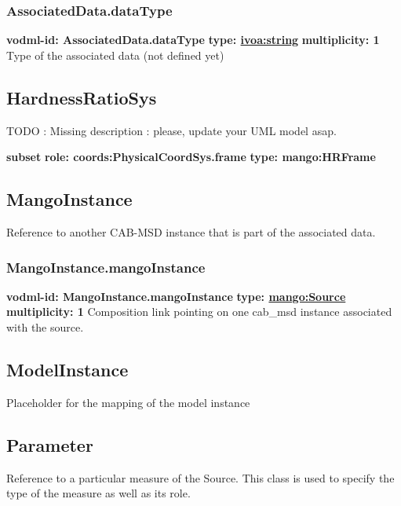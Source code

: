     \subsubsection{AssociatedData.dataType}
      \textbf{vodml-id: AssociatedData.dataType} \newline
      \textbf{type: \hyperref[sect:ivoa]{ivoa:string}} \newline
      \textbf{multiplicity: 1} \newline 
      Type of the associated data (not defined yet)

  \subsection{HardnessRatioSys}
  \label{sect:HardnessRatioSys}
    TODO : Missing description : please, update your UML model asap.

    \noindent \textbf{subset} \newline
    \indent   \textbf{role: coords:PhysicalCoordSys.frame} \newline
    \indent   \textbf{type: mango:HRFrame} \newline


  \subsection{MangoInstance}
  \label{sect:MangoInstance}
    Reference to another CAB-MSD instance that is part of the associated data.

    \subsubsection{MangoInstance.mangoInstance}
      \textbf{vodml-id: MangoInstance.mangoInstance} \newline
      \textbf{type: \hyperref[sect:Source]{mango:Source}} \newline
      \textbf{multiplicity: 1} \newline 
      Composition link pointing on one cab\_msd instance associated with the source.

  \subsection{ModelInstance}
  \label{sect:ModelInstance}
    Placeholder for the mapping of the model instance

  \subsection{Parameter}
  \label{sect:Parameter}
    Reference to a particular measure of the Source. This class is used to specify the type of the measure as well as its role.


